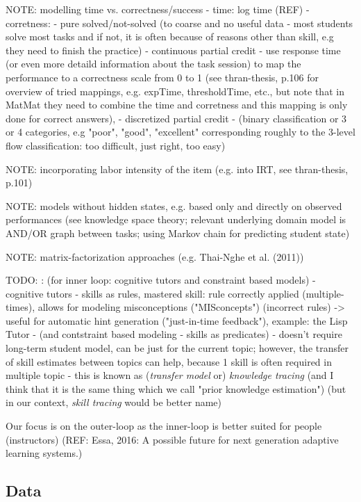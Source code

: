 NOTE: modelling time vs. correctness/success
- time: log time (REF)
- corretness:
  - pure solved/not-solved (to coarse and no useful data - most students solve most tasks and if not, it is often because of reasons other than skill, e.g they need to finish the practice)
  - continuous partial credit - use response time (or even more detaild information about the task session) to map the performance to a correctness scale from 0 to 1 (see thran-thesis, p.106 for overview of tried mappings, e.g. expTime, thresholdTime, etc., but note that in MatMat they need to combine the time and corretness and this mapping is only done for correct answers),
  - discretized partial credit - (binary classification or 3 or 4 categories, e.g "poor", "good", "excellent" corresponding roughly to the 3-level flow classification: too difficult, just right, too easy)

NOTE: incorporating labor intensity of the item (e.g. into IRT, see thran-thesis, p.101)


NOTE: models without hidden states, e.g. based only and directly on observed performances
  (see knowledge space theory; relevant underlying domain model is AND/OR graph between
  tasks; using Markov chain for predicting student state)

NOTE: matrix-factorization approaches (e.g. Thai-Nghe et al. (2011))


TODO: \cite{student-models-review-2012}:
(for inner loop: cognitive tutors and constraint based models)
- cognitive tutors - skills as rules,
  mastered skill: rule correctly applied (multiple-times),
  allows for modeling misconceptions ("MISconcepts") (incorrect rules)
    -> useful for automatic hint generation ("just-in-time feedback"),
  example: the Lisp Tutor
- (and contstraint based modeling - skills as predicates)
- doesn't require long-term student model, can be just for the current topic;
  however, the transfer of skill estimates between topics can help,
  because 1 skill is often required in multiple topic
  - this is known as (\emph{transfer model} or) \emph{knowledge tracing}
  (and I think that it is the same thing which we call "prior knowledge estimation")
  (but in our context, \emph{skill tracing} would be better name)

Our focus is on the outer-loop as the inner-loop is better suited for people (instructors)
(REF: Essa, 2016: A possible future for next generation adaptive learning systems.)

\subsection{Data}
\label{sec:student-modeling.data}


